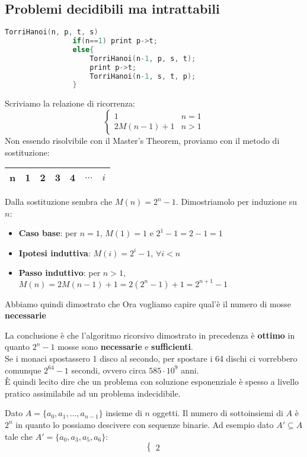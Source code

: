 \subsection{Problemi decidibili ma intrattabili}
\begin{example}[Torre di Hanoi]
		\begin{lstlisting}[language=C, caption=Torre di Hanoi, mathescape=true]
			TorriHanoi(n, p, t, s)
				if(n==1) print p->t;
				else{
					TorriHanoi(n-1, p, s, t);
					print p->t;
					TorriHanoi(n-1, s, t, p);
				}
	\end{lstlisting}
	Scriviamo la relazione di ricorrenza:
	\begin{equation*}
		\begin{cases}
			1 & n=1 \\
			2M(n-1)+1 & n>1
		\end{cases}
	\end{equation*}
	Non essendo risolvibile con il Master's Theorem, proviamo con il metodo di sostituzione:
	\begin{table}[!h]
		\centering
		\begin{tabular}{|c|c|c|c|c|c|c|}
			\hline
			\textbf{n} & 1 & 2 & 3 & 4 & $\ldots$ & $i$ \\
			\hline
		\end{tabular}
	\end{table}
	Dalla sostituzione sembra che $M(n)=2^n-1$. Dimostriamolo per induzione su $n$:
	\begin{itemize}
		\item \textbf{Caso base}: per $n=1$, $M(1)=1$ e $2^1-1 = 2-1 = 1$
		\item \textbf{Ipotesi induttiva}: $M(i) = 2^i-1$, $\forall i < n$
		\item \textbf{Passo induttivo}: per $n>1$, $M(n)=2M(n-1)+1=2(2^n-1)+1 = 2^{n+1}-1$
	\end{itemize}
	Abbiamo quindi dimostrato che 
	Ora vogliamo capire qual'è il numero di mosse \textbf{necessarie} 
	
	La conclusione è che l'algoritmo ricorsivo dimostrato in precedenza è \textbf{ottimo} in quanto $2^n-1$ mosse sono \textbf{necessarie} e \textbf{sufficienti}.\\
	Se i monaci spostassero 1 disco al secondo, per spostare i 64 dischi ci vorrebbero comunque $2^{64}-1$ secondi, ovvero circa $585 \cdot 10^9$ anni.\\
	È quindi lecito dire che un problema con soluzione esponenziale è spesso a livello pratico assimilabile ad un problema indecidibile.
\end{example}
\begin{example}
	Dato $A=\{a_0, a_1, \ldots, a_{n-1}\}$ insieme di $n$ oggetti. Il numero di sottoinsiemi di $A$ è $2^n$ in quanto lo possiamo descivere con sequenze binarie. Ad esempio dato $A' \subseteq A$ tale che $A'=\{a_0, a_3, a_5, a_6\}$:
	\begin{equation*}
		\begin{cases}
			2
		\end{cases}
	\end{equation*}
	
\end{example}